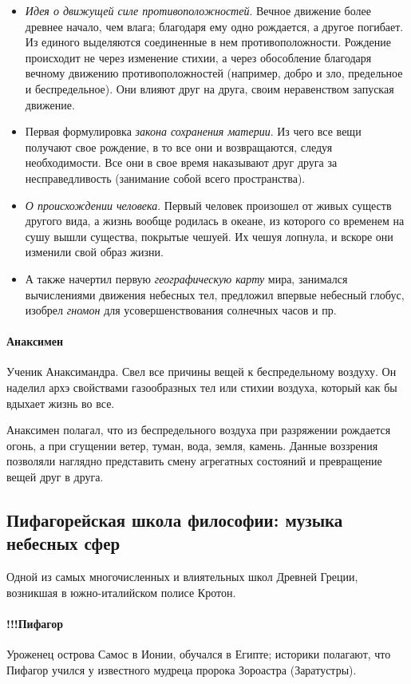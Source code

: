 \begin{itemize}
    \item \textit{Идея о движущей силе противоположностей}. Вечное движение более древнее начало, чем влага; благодаря ему одно рождается, а другое погибает. Из единого выделяются соединенные в нем противоположности.  Рождение происходит не через изменение стихии, а через обособление благодаря вечному движению противоположностей (например, добро и зло, предельное и беспредельное). Они влияют друг на друга, своим неравенством запуская движение.
    \item Первая формулировка \textit{закона сохранения материи}. Из чего все вещи получают свое рождение, в то все они и возвращаются, следуя необходимости. Все они в свое время наказывают друг друга за несправедливость (занимание собой всего пространства).
    \item \textit{О происхождении человека}. Первый человек произошел от живых существ другого вида, а жизнь вообще родилась в океане, из которого со временем на сушу вышли существа, покрытые чешуей. Их чешуя лопнула, и вскоре они изменили свой образ жизни.
    \item А также начертил первую \textit{географическую карту} мира, занимался вычислениями движения небесных тел, предложил впервые небесный глобус, изобрел \textit{гномон} для усовершенствования солнечных часов и пр.
\end{itemize}

\paragraph{Анаксимен} Ученик Анаксимандра. Свел все причины вещей к беспредельному
воздуху. Он наделил архэ свойствами газообразных тел или стихии воздуха, который как бы вдыхает жизнь во все.  

Анаксимен полагал, что из беспредельного воздуха при разряжении рождается огонь, а при сгущении ветер, туман, вода, земля, камень. Данные воззрения позволяли наглядно представить смену агрегатных состояний и превращение вещей друг в друга.

\subsection{Пифагорейская школа философии: музыка небесных сфер}

Одной из самых многочисленных и влиятельных школ Древней Греции, возникшая в южно-италийском полисе Кротон. 

\paragraph{!!!Пифагор} Уроженец острова Самос в Ионии, обучался в Египте; историки полагают, что Пифагор учился у известного мудреца пророка Зороастра (Заратустры).

